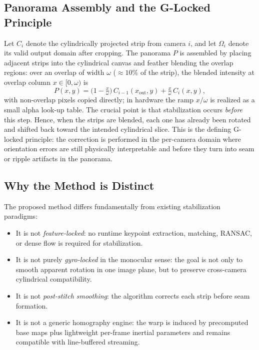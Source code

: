 \documentclass[journal]{IEEEtran}
\begin{document}
\subsection{Panorama Assembly and the G-Locked Principle}
Let $C_i$ denote the cylindrically projected strip from camera $i$, and let $\Omega_i$ denote its valid output domain after cropping. The panorama $P$ is assembled by placing adjacent strips into the cylindrical canvas and feather blending the overlap regions: over an overlap of width $\omega$ (${\approx}10\%$ of the strip), the blended intensity at overlap column $x\in[0,\omega)$ is
\begin{equation}
P(x,y) = \big(1-\tfrac{x}{\omega}\big)\,C_{i-1}(x_{\mathrm{out}},y) + \tfrac{x}{\omega}\,C_i(x,y),
\label{eq:feather}
\end{equation}
with non-overlap pixels copied directly; in hardware the ramp $x/\omega$ is realized as a small alpha look-up table. The crucial point is that stabilization occurs \emph{before} this step. Hence, when the strips are blended, each one has already been rotated and shifted back toward the intended cylindrical slice. This is the defining G-locked principle: the correction is performed in the per-camera domain where orientation errors are still physically interpretable and before they turn into seam or ripple artifacts in the panorama.

\subsection{Why the Method is Distinct}
The proposed method differs fundamentally from existing stabilization paradigms:
\begin{itemize}[leftmargin=*,itemsep=0pt,topsep=2pt]
  \item It is not \emph{feature-locked}: no runtime keypoint extraction, matching, RANSAC, or dense flow is required for stabilization.
  \item It is not purely \emph{gyro-locked} in the monocular sense: the goal is not only to smooth apparent rotation in one image plane, but to preserve cross-camera cylindrical compatibility.
  \item It is not \emph{post-stitch smoothing}: the algorithm corrects each strip before seam formation.
  \item It is not a generic homography engine: the warp is induced by precomputed base maps plus lightweight per-frame inertial parameters and remains compatible with line-buffered streaming.
\end{itemize}
\end{document}
